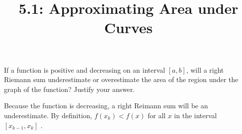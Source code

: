 \documentclass[nooutcomes,handout]{ximera}
\title{5.1: Approximating Area under Curves}
\begin{document}
\begin{abstract}

\end{abstract}
\maketitle


\begin{problem}
  If a function is positive and decreasing on an interval $[a,b]$,  will a right Riemann sum underestimate or overestimate the area of the region under the graph of the function?
  Justify your answer.

\begin{freeResponse}
  Because the function is decreasing, a right Reimann sum will be an underestimate.
  By definition, $f(x_k)< f(x)$ for all $x$ in the interval $[x_{k-1},x_k]$ .
\end{freeResponse}	
		

\end{problem}
\end{document}
